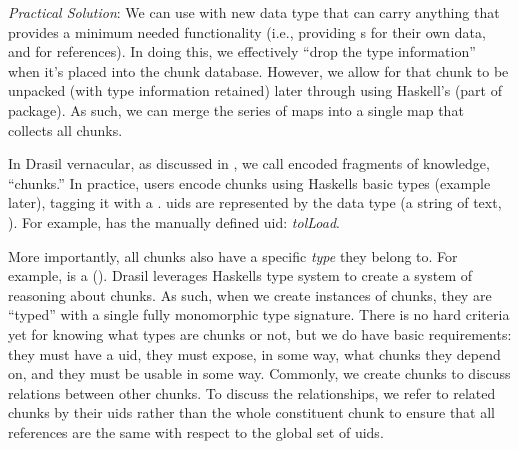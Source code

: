 \begin{writingdirectives}
      \item \textit{Practical Solution}: We can use \ExistentialQuantification{}
            with new data type that can carry anything that provides a minimum
            needed functionality (i.e., providing \UID{}s for their own data,
            and for references). In doing this, we effectively ``drop the type
            information'' when it's placed into the chunk database. However, we
            allow for that chunk to be unpacked (with type information retained)
            later through using Haskell's  (part of
             package). As such, we can merge the series of maps
            into a single map that collects all chunks.

\end{writingdirectives}

In Drasil vernacular, as discussed in , we call encoded
fragments of knowledge, ``chunks.'' In practice, users encode chunks using
Haskells basic  types (example later), tagging it with a
. \acsp{uid} are represented by the \UID{} data type (a string of text,
). For example, 
has the manually defined \acs{uid}: \textit{tolLoad}.

More importantly, all chunks also have a specific \textit{type} they belong to.
For example,  is a \QuantityDict{}
(). Drasil leverages Haskells type system to
create a system of reasoning about chunks. As such, when we create instances of
chunks, they are ``typed'' with a single fully monomorphic type signature. There
is no hard criteria yet for knowing what  types are chunks or
not, but we do have basic requirements: they must have a \acs{uid}, they must
expose, in some way, what chunks they depend on, and they must be usable in some
way. Commonly, we create chunks to discuss relations between other chunks. To
discuss the relationships, we refer to related chunks by their \acsp{uid} rather
than the whole constituent chunk to ensure that all references are the same with
respect to the global set of \acsp{uid}.

